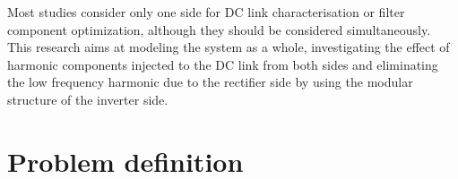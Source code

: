 \documentclass[conference,a4paper,twocolumn]{IEEEtran}
\begin{document}
\vspace{50 mm}

Most studies consider only one side for DC link characterisation or filter component optimization, although they should be considered simultaneously. This research aims at modeling the system as a whole, investigating the effect of harmonic components injected to the DC link from both sides and eliminating the low frequency harmonic due to the rectifier side by using the modular structure of the inverter side.

\section{Problem definition}
\end{document}
